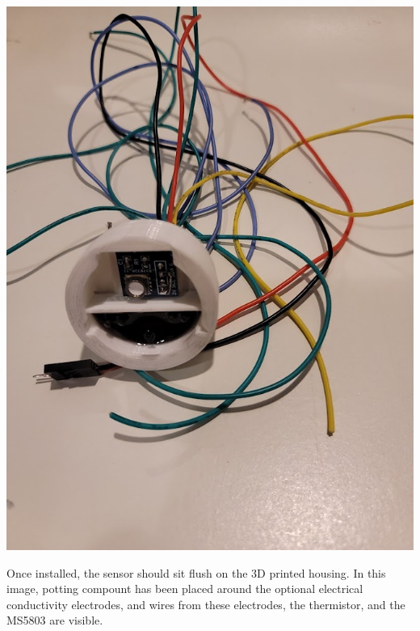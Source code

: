 \begin{enumerate}
    \begin{marginfigure}
    	\begin{center}
        \includegraphics[width=\MFW]{Images/AppendixB_mount_in_cap.jpg}
    		\caption[Mounting for \texttt{MS5803}]{Once installed, the sensor should sit flush on the 3D printed housing. In this image, potting compount has been placed around the optional electrical conductivity electrodes, and wires from these electrodes, the thermistor, and the MS5803 are visible.}
    	\end{center}
    \end{marginfigure}


\end{enumerate}
